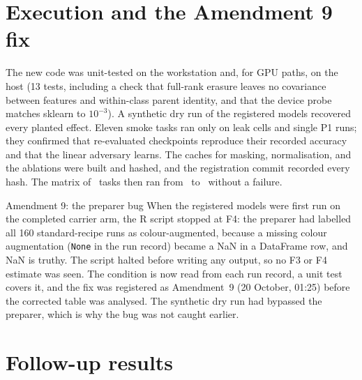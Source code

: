 \chapter{Execution and the Amendment 9 fix}
\label{r:ch:a8-exec}

The new code was unit-tested on the workstation and, for GPU paths, on the host (13 tests, including a check that
full-rank erasure leaves no covariance between features and within-class parent identity, and that the device probe
matches sklearn to $10^{-3}$). A synthetic dry run of the registered models recovered every planted effect. Eleven smoke
tasks ran only on leak cells and single P1 runs; they confirmed that re-evaluated checkpoints reproduce their recorded
accuracy and that the linear adversary learns. The caches for masking, normalisation, and the ablations were built and
hashed, and the registration commit recorded every hash. The matrix of \RecFollowTasks\ tasks then ran from
\RecFollowStart\ to \RecFollowEnd\ without a failure.

\begin{warningbox}{Amendment 9: the preparer bug}
When the registered models were first run on the completed carrier arm, the R script stopped at F4: the preparer had
labelled all 160 standard-recipe runs as colour-augmented, because a missing colour augmentation (\texttt{None} in the run
record) became a NaN in a DataFrame row, and NaN is truthy. The script halted before writing any output, so no F3 or F4
estimate was seen. The condition is now read from each run record, a unit test covers it, and the fix was registered as
Amendment~9 (20 October, 01:25) before the corrected table was analysed. The synthetic dry run had bypassed the preparer,
which is why the bug was not caught earlier.
\end{warningbox}

\chapter{Follow-up results}
\label{r:ch:a8-results}

